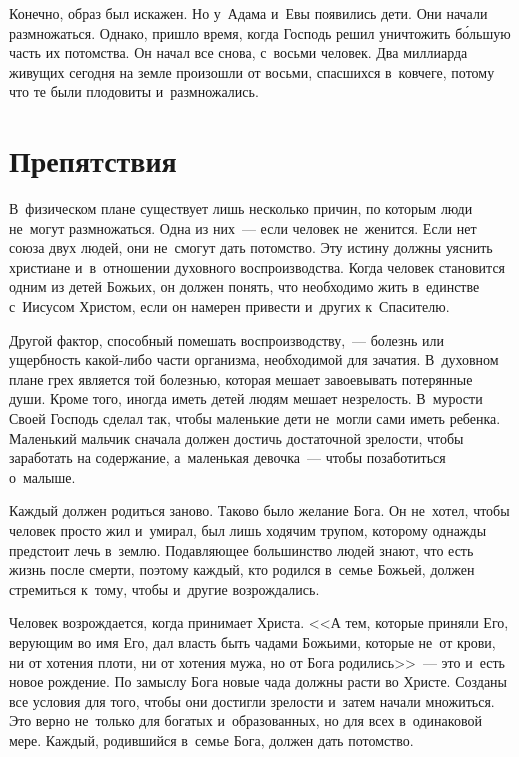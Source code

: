\documentclass[12pt,article,a4paper,fittopage]{ncc}
\begin{document}
\begin{multicols}{2}
Конечно, образ был искажен. Но у~Адама и~Евы появились дети. Они начали размножаться. Однако, пришло время, когда Господь решил уничтожить б\'{о}льшую часть их потомства. Он начал все снова, с~восьми человек. Два миллиарда живущих сегодня на земле произошли от восьми, спасшихся в~ковчеге, потому что те были плодовиты и~размножались.

\section*{Препятствия}

В~физическом плане существует лишь несколько причин, по которым люди не~могут размножаться. Одна из них~--- если человек не~женится. Если нет союза двух людей, они не~смогут дать потомство. Эту истину должны уяснить христиане и~в~отношении духовного воспроизводства. Когда человек становится одним из детей Божьих, он должен понять, что необходимо жить в~единстве с~Иисусом Христом, если он намерен привести и~других к~Спасителю.

Другой фактор, способный помешать воспроизводству,~--- болезнь или ущербность какой-либо части организма, необходимой для зачатия. В~духовном плане грех является той болезнью, которая мешает завоевывать потерянные души. Кроме того, иногда иметь детей людям мешает незрелость. В~мурости Своей Господь сделал так, чтобы маленькие дети не~могли сами иметь ребенка. Маленький мальчик сначала должен достичь достаточной зрелости, чтобы заработать на содержание, а~маленькая девочка~--- чтобы позаботиться о~малыше.

\pagestyle{lheadings}

Каждый должен родиться заново. Таково было желание Бога. Он не~хотел, чтобы человек просто жил и~умирал, был лишь ходячим трупом, которому однажды предстоит лечь в~землю. Подавляющее большинство людей знают, что есть жизнь после смерти, поэтому каждый, кто родился в~семье Божьей, должен стремиться к~тому, чтобы и~другие возрождались.

Человек возрождается, когда принимает Христа. <<А тем, которые приняли Его, верующим во имя Его, дал власть быть чадами Божьими, которые не~от крови, ни от хотения плоти, ни от хотения мужа, но от Бога родились>>~--- это и~есть новое рождение. По замыслу Бога новые чада должны расти во Христе. Созданы все условия для того, чтобы они достигли зрелости и~затем начали множиться. Это верно не~только для богатых и~образованных, но для всех в~одинаковой мере. Каждый, родившийся в~семье Бога, должен дать потомство.


\end{multicols}
\end{document}
